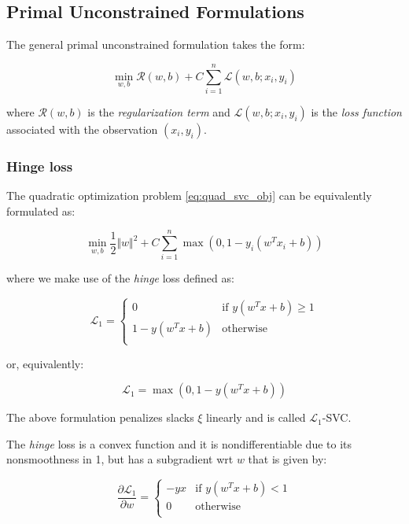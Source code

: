 \subsection{Primal Unconstrained Formulations}

The general primal unconstrained formulation takes the form:

\begin{equation} \label{eq:primal_svc}
    \min_{w,b} \mathcal{R}(w,b) + C \sum_{i=1}^n \mathcal{L}(w,b;x_i,y_i)
\end{equation}

where $\mathcal{R}(w, b)$ is the \emph{regularization term} and $\mathcal{L}(w,b;x_i,y_i)$ is the \emph{loss function} associated with the observation $(x_i,y_i)$.

\subsubsection{Hinge loss}

The quadratic optimization problem \ref{eq:quad_svc_obj} can be equivalently formulated as: 

\begin{equation} \label{eq:svc_hinge}
    \min_{w,b} \frac{1}{2} \Vert w \Vert^2 + C \sum_{i=1}^n \max(0, 1 - y_i (w^T x_i + b))
\end{equation}

where we make use of the \emph{hinge} loss defined as:

\begin{equation} \label{eq:hinge_loss1}
	\mathcal{L}_1 = 
	\begin{cases}
		0 & \text{if } y (w^T x + b) \geq 1 \\
		1 - y (w^T x + b) & \text{otherwise} \\
	\end{cases}
\end{equation}

or, equivalently:

\begin{equation} \label{eq:hinge_loss2}
	\mathcal{L}_1 = \max(0, 1 - y (w^T x + b))
\end{equation}

The above formulation penalizes slacks $\xi$ linearly and is called $\mathcal{L}_1$-SVC.

The \emph{hinge} loss is a convex function and it is nondifferentiable due to its nonsmoothness in 1, but has a subgradient wrt $w$ that is given by:

\begin{equation} \label{eq:hinge_loss_der}
    \frac{\partial \mathcal{L}_1}{\partial w}=
        \begin{cases}
            -y x & \text{if } y (w^T x + b) < 1 \\
            0 & \text{otherwise} \\ 
        \end{cases}
\end{equation}

